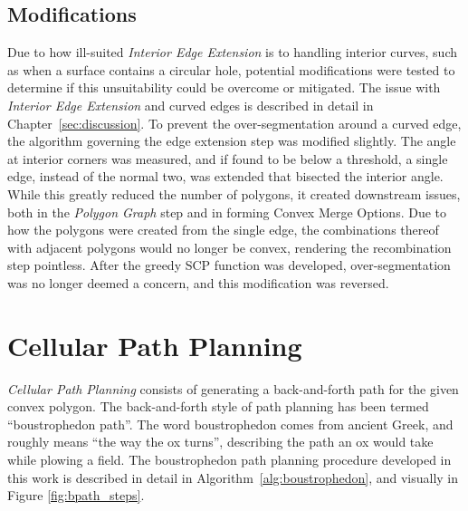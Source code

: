 \subsection{Modifications}
Due to how ill-suited \textit{Interior Edge Extension} is to handling interior curves, such as when a surface contains a circular hole, potential modifications were tested to determine if this unsuitability could be overcome or mitigated.
The issue with \textit{Interior Edge Extension} and curved edges is described in detail in Chapter~\ref{sec:discussion}.
To prevent the over-segmentation around a curved edge, the algorithm governing the edge extension step was modified slightly.
The angle at interior corners was measured, and if found to be below a threshold, a single edge, instead of the normal two, was extended that bisected the interior angle.
While this greatly reduced the number of polygons, it created downstream issues, both in the \textit{Polygon Graph} step and in forming Convex Merge Options.
Due to how the polygons were created from the single edge, the combinations thereof with adjacent polygons would no longer be convex, rendering the recombination step pointless.
After the greedy SCP function was developed, over-segmentation was no longer deemed a concern, and this modification was reversed.

\section{Cellular Path Planning}
\textit{Cellular Path Planning} consists of generating a back-and-forth path for the given convex polygon.
The back-and-forth style of path planning has been termed ``boustrophedon path''.
The word boustrophedon comes from ancient Greek, and roughly means ``the way the ox turns'', describing the path an ox would take while plowing a field.
The boustrophedon path planning procedure developed in this work is described in detail in Algorithm~\ref{alg:boustrophedon}, and visually in Figure \ref{fig:bpath_steps}.

